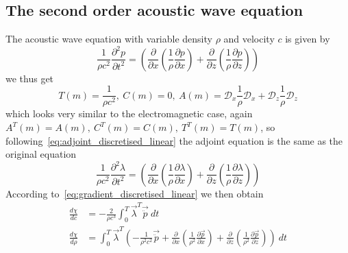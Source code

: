 \documentclass[10pt]{SelfArx} %
\newcommand{\pder}[2][]{\frac{\partial#1}{\partial#2}}
\newcommand{\ppder}[2][]{\frac{\partial^2#1}{\partial#2^2}}
\theoremstyle{definition}
\begin{document}
\subsection{The second order acoustic wave equation}
The acoustic wave equation with variable density $\rho$ and velocity $c$ is given by
\begin{equation}\label{eq:second_order_acoustic}
\frac{1}{\rho c^2}\ppder[p]{t} = \left(\pder{x}\left(\frac{1}{\rho}\pder[p]{x}\right) + \pder{z}\left(\frac{1}{\rho}\pder[p]{z}\right) \right)
\end{equation}
we thus get 
\begin{equation}
T(m) = \frac{1}{\rho c^2}, \ C(m) = 0, \ A(m) = \mathcal{D}_x\frac{1}{\rho}\mathcal{D}_x + \mathcal{D}_z \frac{1}{\rho} \mathcal{D}_z
\end{equation}
which looks very similar to the electromagnetic case, again $A^T(m) = A(m), \ C^T(m) = C(m), \ T^T(m) = T(m) $, so following~\cref{eq:adjoint_discretised_linear} the adjoint equation is the same as the original equation
\begin{equation}
\frac{1}{\rho c^2}\ppder[\lambda]{t} = \left(\pder{x}\left(\frac{1}{\rho}\pder[\lambda]{x}\right) + \pder{z}\left(\frac{1}{\rho}\pder[\lambda]{z}\right) \right)
\end{equation}
According to~\cref{eq:gradient_discretised_linear} we then obtain
\begin{equation}
\begin{aligned}
\frac{d\chi}{dc} &=-\frac{2}{\rho c^3} \int_0^T\vec{\lambda}^T\vec{\ddot{p}} \ dt \\
\frac{d\chi}{d\rho} &= \int_0^T\vec{\lambda}^T\left(-\frac{1}{\rho^2 c^2} \vec{\ddot{p}} + \pder{x}\left(\frac{1}{\rho^2}\pder[\vec{p}]{x}\right) + \pder{z}\left(\frac{1}{\rho^2} \pder[\vec{p}]{z}\right)\right)\ dt \\
\end{aligned}
\end{equation}
\end{document}
